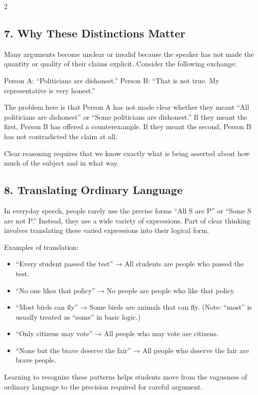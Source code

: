 \documentclass[12pt]{article}
\begin{document}
\begin{multicols}{2}
\subsection*{7. Why These Distinctions Matter}
Many arguments become unclear or invalid because the speaker has not made the quantity or quality of their claims explicit. Consider the following exchange:

Person A: “Politicians are dishonest.”
Person B: “That is not true. My representative is very honest.”

The problem here is that Person A has not made clear whether they meant “All politicians are dishonest” or “Some politicians are dishonest.” If they meant the first, Person B has offered a counterexample. If they meant the second, Person B has not contradicted the claim at all.

Clear reasoning requires that we know exactly what is being asserted about how much of the subject and in what way.

\subsection*{8. Translating Ordinary Language}
In everyday speech, people rarely use the precise forms “All S are P” or “Some S are not P.” Instead, they use a wide variety of expressions. Part of clear thinking involves translating these varied expressions into their logical form.

Examples of translation:
\begin{itemize}
\item “Every student passed the test” → All students are people who passed the test.
\item “No one likes that policy” → No people are people who like that policy.
\item “Most birds can fly” → Some birds are animals that can fly. (Note: “most” is usually treated as “some” in basic logic.)
\item “Only citizens may vote” → All people who may vote are citizens.
\item “None but the brave deserve the fair” → All people who deserve the fair are brave people.
\end{itemize}

Learning to recognize these patterns helps students move from the vagueness of ordinary language to the precision required for careful argument.


\end{multicols}
\end{document}
